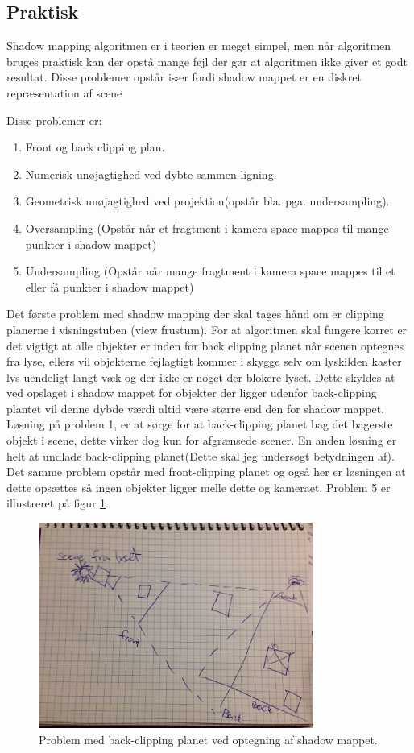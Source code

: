 \documentclass[11pt,a4paper]{article}
\begin{document}
\subsection{Praktisk}


Shadow mapping algoritmen er i teorien er meget simpel, men når algoritmen bruges praktisk kan der opstå mange fejl der gør at algoritmen ikke giver et godt resultat. Disse problemer opstår især fordi shadow mappet er en diskret repræsentation af scene 

Disse problemer er:
\begin{enumerate}
\item Front og back clipping plan.
\item Numerisk unøjagtighed ved dybte sammen ligning.
\item Geometrisk unøjagtighed ved projektion(opstår bla. pga. undersampling).
\item Oversampling (Opstår når et fragtment i kamera space mappes til mange punkter i shadow mappet)
\item Undersampling (Opstår når mange fragtment i kamera space mappes til et eller få punkter i shadow mappet)
\end{enumerate}

Det første problem med shadow mapping der skal tages hånd om er clipping planerne i visningstuben (view frustum). For at algoritmen skal fungere korret er det vigtigt at alle objekter er inden for back clipping planet når scenen optegnes fra lyse, ellers vil objekterne fejlagtigt kommer i skygge selv om lyskilden kaster lys uendeligt langt væk og der ikke er noget der blokere lyset. Dette skyldes at ved opslaget i shadow mappet for objekter der ligger udenfor back-clipping plantet vil denne dybde værdi altid være større end den for shadow mappet. Løsning på problem 1, er at sørge for at back-clipping planet bag det bagerste objekt i scene, dette virker dog kun for afgrænsede scener. En anden løsning er helt at undlade back-clipping planet(Dette skal jeg undersøgt betydningen af). Det samme problem opstår med front-clipping planet og også her er løsningen at dette opsættes så ingen objekter ligger melle dette og kameraet. Problem 5 er illustreret på figur \ref{P1}. 

\begin{figure}[ht!]
\centering
\includegraphics[width=90mm]{img/P1.jpg}
\caption{Problem med back-clipping planet ved optegning af shadow mappet.}
\label{P1}
\end{figure}
\end{document}
